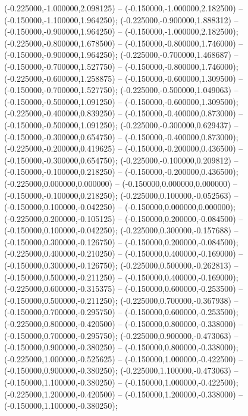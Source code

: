  (-0.225000,-1.000000,2.098125) -- (-0.150000,-1.000000,2.182500) -- (-0.150000,-1.100000,1.964250);
 (-0.225000,-0.900000,1.888312) -- (-0.150000,-0.900000,1.964250) -- (-0.150000,-1.000000,2.182500);
 (-0.225000,-0.800000,1.678500) -- (-0.150000,-0.800000,1.746000) -- (-0.150000,-0.900000,1.964250);
 (-0.225000,-0.700000,1.468687) -- (-0.150000,-0.700000,1.527750) -- (-0.150000,-0.800000,1.746000);
 (-0.225000,-0.600000,1.258875) -- (-0.150000,-0.600000,1.309500) -- (-0.150000,-0.700000,1.527750);
 (-0.225000,-0.500000,1.049063) -- (-0.150000,-0.500000,1.091250) -- (-0.150000,-0.600000,1.309500);
 (-0.225000,-0.400000,0.839250) -- (-0.150000,-0.400000,0.873000) -- (-0.150000,-0.500000,1.091250);
 (-0.225000,-0.300000,0.629437) -- (-0.150000,-0.300000,0.654750) -- (-0.150000,-0.400000,0.873000);
 (-0.225000,-0.200000,0.419625) -- (-0.150000,-0.200000,0.436500) -- (-0.150000,-0.300000,0.654750);
 (-0.225000,-0.100000,0.209812) -- (-0.150000,-0.100000,0.218250) -- (-0.150000,-0.200000,0.436500);
 (-0.225000,0.000000,0.000000) -- (-0.150000,0.000000,0.000000) -- (-0.150000,-0.100000,0.218250);
 (-0.225000,0.100000,-0.052563) -- (-0.150000,0.100000,-0.042250) -- (-0.150000,0.000000,0.000000);
 (-0.225000,0.200000,-0.105125) -- (-0.150000,0.200000,-0.084500) -- (-0.150000,0.100000,-0.042250);
 (-0.225000,0.300000,-0.157688) -- (-0.150000,0.300000,-0.126750) -- (-0.150000,0.200000,-0.084500);
 (-0.225000,0.400000,-0.210250) -- (-0.150000,0.400000,-0.169000) -- (-0.150000,0.300000,-0.126750);
 (-0.225000,0.500000,-0.262813) -- (-0.150000,0.500000,-0.211250) -- (-0.150000,0.400000,-0.169000);
 (-0.225000,0.600000,-0.315375) -- (-0.150000,0.600000,-0.253500) -- (-0.150000,0.500000,-0.211250);
 (-0.225000,0.700000,-0.367938) -- (-0.150000,0.700000,-0.295750) -- (-0.150000,0.600000,-0.253500);
 (-0.225000,0.800000,-0.420500) -- (-0.150000,0.800000,-0.338000) -- (-0.150000,0.700000,-0.295750);
 (-0.225000,0.900000,-0.473063) -- (-0.150000,0.900000,-0.380250) -- (-0.150000,0.800000,-0.338000);
 (-0.225000,1.000000,-0.525625) -- (-0.150000,1.000000,-0.422500) -- (-0.150000,0.900000,-0.380250);
 (-0.225000,1.100000,-0.473063) -- (-0.150000,1.100000,-0.380250) -- (-0.150000,1.000000,-0.422500);
 (-0.225000,1.200000,-0.420500) -- (-0.150000,1.200000,-0.338000) -- (-0.150000,1.100000,-0.380250);
